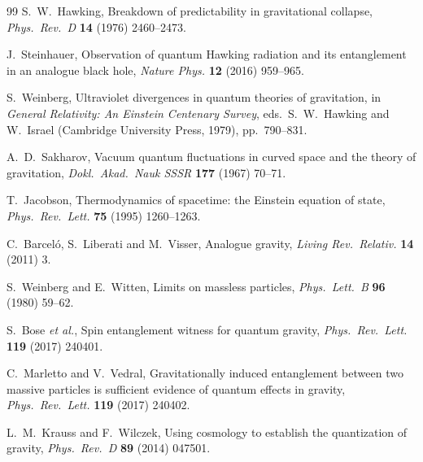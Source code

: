 \begin{thebibliography}{99}
 S.~W.~Hawking, Breakdown of predictability in
  gravitational collapse, \emph{Phys.\ Rev.\ D} \textbf{14} (1976)
  2460--2473.

 J.~Steinhauer, Observation of quantum Hawking
  radiation and its entanglement in an analogue black hole,
  \emph{Nature Phys.} \textbf{12} (2016) 959--965.

 S.~Weinberg, Ultraviolet divergences in quantum
  theories of gravitation, in \emph{General Relativity: An Einstein
  Centenary Survey}, eds.\ S.~W.~Hawking and W.~Israel (Cambridge
  University Press, 1979), pp.~790--831.

 A.~D.~Sakharov, Vacuum quantum fluctuations in
  curved space and the theory of gravitation, \emph{Dokl.\ Akad.\ Nauk
  SSSR} \textbf{177} (1967) 70--71.

 T.~Jacobson, Thermodynamics of spacetime: the
  Einstein equation of state, \emph{Phys.\ Rev.\ Lett.} \textbf{75}
  (1995) 1260--1263.

 C.~Barcel\'o, S.~Liberati and M.~Visser, Analogue
  gravity, \emph{Living Rev.\ Relativ.} \textbf{14} (2011) 3.

 S.~Weinberg and E.~Witten, Limits on massless particles,
  \emph{Phys.\ Lett.\ B} \textbf{96} (1980) 59--62.

 S.~Bose \emph{et al.}, Spin entanglement witness for
  quantum gravity, \emph{Phys.\ Rev.\ Lett.} \textbf{119} (2017) 240401.

 C.~Marletto and V.~Vedral, Gravitationally induced
  entanglement between two massive particles is sufficient evidence of
  quantum effects in gravity, \emph{Phys.\ Rev.\ Lett.} \textbf{119}
  (2017) 240402.

 L.~M.~Krauss and F.~Wilczek, Using cosmology to
  establish the quantization of gravity, \emph{Phys.\ Rev.\ D}
  \textbf{89} (2014) 047501.

\end{thebibliography}
